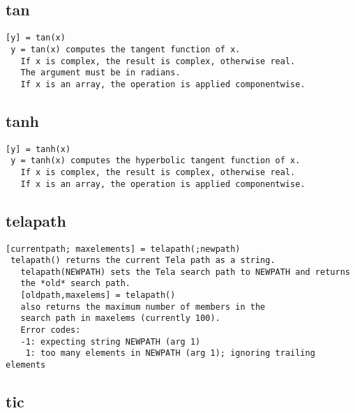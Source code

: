 \documentclass[a4paper]{article}
\begin{document}
\subsection{tan\label{tan}}

\begin{tscreen}
\begin{verbatim}
[y] = tan(x)
 y = tan(x) computes the tangent function of x.
   If x is complex, the result is complex, otherwise real.
   The argument must be in radians.
   If x is an array, the operation is applied componentwise.
\end{verbatim}
\end{tscreen}



\subsection{tanh\label{tanh}}

\begin{tscreen}
\begin{verbatim}
[y] = tanh(x)
 y = tanh(x) computes the hyperbolic tangent function of x.
   If x is complex, the result is complex, otherwise real.
   If x is an array, the operation is applied componentwise.
\end{verbatim}
\end{tscreen}



\subsection{telapath\label{telapath}}

\begin{tscreen}
\begin{verbatim}
[currentpath; maxelements] = telapath(;newpath)
 telapath() returns the current Tela path as a string.
   telapath(NEWPATH) sets the Tela search path to NEWPATH and returns
   the *old* search path.
   [oldpath,maxelems] = telapath()
   also returns the maximum number of members in the
   search path in maxelems (currently 100).
   Error codes:
   -1: expecting string NEWPATH (arg 1)
    1: too many elements in NEWPATH (arg 1); ignoring trailing elements
\end{verbatim}
\end{tscreen}



\subsection{tic\label{tic}}
\end{document}
